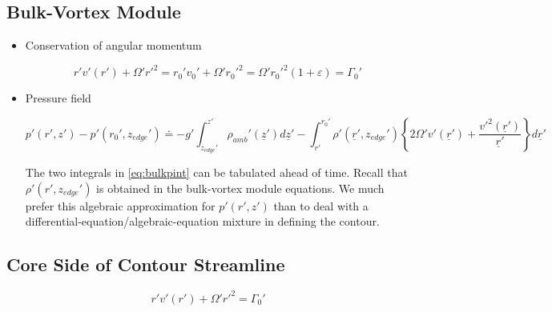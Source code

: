\documentclass[preprint, prX]{revtex4}
\newcommand{\zedge}{z_{edge}}
\begin{document}
\subsection{Bulk-Vortex Module}

\begin{itemize}
\item Conservation of angular momentum

\begin{equation}
	r'v'(r') + \Omega' r'^2 = r_0' v_0' + \Omega'r_0'^2 = \Omega' r_0'^2(1+\varepsilon) = \Gamma_0'
\end{equation}

\item Pressure field

\begin{equation}
	p'(r',z') - p'(r_0',\zedge') \doteq - g' \int_{\zedge'}^{z'} \rho_{amb}'( \underline{z}') d \underline{z}' - \int_{r'}^{r_0'} \rho'(\underline{r}', \zedge')\left \{ 2 \Omega' v'(\underline{r}') + \frac{v'^2(\underline{r}')}{\underline{r}'} \right \} d\underline{r}'
	\label{eq:bulkpint}
\end{equation}

The two integrals in \eqref{eq:bulkpint} can be tabulated ahead of time. Recall that $\rho'(r',\zedge')$ is obtained in the bulk-vortex module equations. We much prefer this algebraic approximation for $p'(r',z')$ than to deal with a differential-equation/algebraic-equation mixture in defining the contour.

\end{itemize} 

\subsection{Core Side of Contour Streamline}
\begin{equation}
	r'v'(r') + \Omega' r'^2 = \Gamma_0'
\end{equation}
\end{document}
